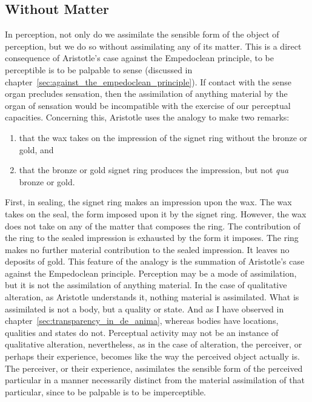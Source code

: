 
\subsection{Without Matter} %
\label{sub:without_matter}

In perception, not only do we assimilate the sensible form of the object of perception, but we do so without assimilating any of its matter. This is a direct consequence of Aristotle's case against the Empedoclean principle, to be perceptible is to be palpable to sense (discussed in chapter~\ref{sec:against_the_empedoclean_principle}). If contact with the sense organ precludes sensation, then the assimilation of anything material by the organ of sensation would be incompatible with the exercise of our perceptual capacities. Concerning this, Aristotle uses the analogy to make two remarks:
\begin{enumerate}[(1)]
	\item that the wax takes on the impression of the signet ring without the bronze or gold, and
	\item that the bronze or gold signet ring produces the impression, but not \emph{qua} bronze or gold.
\end{enumerate}

First, in sealing, the signet ring makes an impression upon the wax. The wax takes on the seal, the form imposed upon it by the signet ring. However, the wax does not take on any of the matter that composes the ring.  The contribution of the ring to the sealed impression is exhausted by the form it imposes. The ring makes no further material contribution to the sealed impression. It leaves no deposits of gold. This feature of the analogy is the summation of Aristotle's case against the Empedoclean principle. Perception may be a mode of assimilation, but it is not the assimilation of anything material. In the case of qualitative alteration, as Aristotle understands it, nothing material is assimilated. What is assimilated is not a body, but a quality or state. And as I have observed in chapter~\ref{sec:transparency_in_de_anima}, whereas bodies have locations, qualities and states do not. Perceptual activity may not be an instance of qualitative alteration, nevertheless, as in the case of alteration, the perceiver, or perhaps their experience, becomes like the way the perceived object actually is. The perceiver, or their experience, assimilates the sensible form of the perceived particular in a manner necessarily distinct from the material assimilation of that particular, since to be palpable is to be imperceptible.

